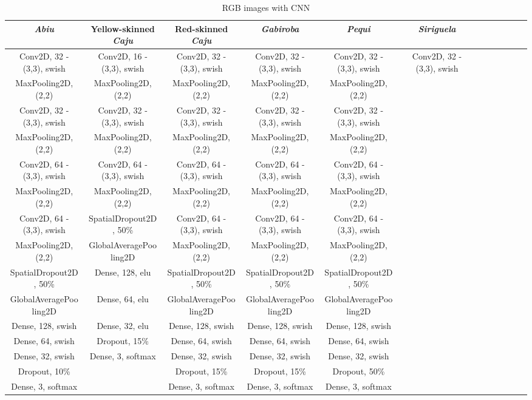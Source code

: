 \documentclass[../main.tex]{subfile}
\begin{document}
\begin{table*}[t]
    \caption{RGB images with CNN}
    \label{tab:rgb-details}

    \centering
    \begin{tabular*}{\textwidth}{@{\extracolsep{\fill}} c c c c c c c c c c c c }
        \toprule
        \textit{Abiu} & Yellow-skinned \textit{Caju}  & Red-skinned \textit{Caju} & \textit{Gabiroba} & \textit{Pequi} & \textit{Siriguela} \\
        \midrule
        Conv2D, 32 - (3,3), swish & Conv2D, 16 - (3,3), swish & Conv2D, 32 - (3,3), swish & Conv2D, 32 - (3,3), swish & Conv2D, 32 - (3,3), swish & Conv2D, 32 - (3,3), swish \\
        MaxPooling2D, (2,2) & MaxPooling2D, (2,2) & MaxPooling2D, (2,2) & MaxPooling2D, (2,2) & MaxPooling2D, (2,2) & \\
        Conv2D, 32 - (3,3), swish & Conv2D, 32 - (3,3), swish & Conv2D, 32 - (3,3), swish & Conv2D, 32 - (3,3), swish & Conv2D, 32 - (3,3), swish & \\
        MaxPooling2D, (2,2) & MaxPooling2D, (2,2) & MaxPooling2D, (2,2) & MaxPooling2D, (2,2) & MaxPooling2D, (2,2) & \\
        Conv2D, 64 - (3,3), swish & Conv2D, 64 - (3,3), swish & Conv2D, 64 - (3,3), swish & Conv2D, 64 - (3,3), swish & Conv2D, 64 - (3,3), swish & \\
        MaxPooling2D, (2,2) & MaxPooling2D, (2,2) & MaxPooling2D, (2,2) & MaxPooling2D, (2,2) & MaxPooling2D, (2,2) & \\
        Conv2D, 64 - (3,3), swish & SpatialDropout2D, 50\% & Conv2D, 64 - (3,3), swish & Conv2D, 64 - (3,3), swish & Conv2D, 64 - (3,3), swish & \\
        MaxPooling2D, (2,2) & GlobalAveragePooling2D & MaxPooling2D, (2,2) & MaxPooling2D, (2,2) & MaxPooling2D, (2,2) & \\
        SpatialDropout2D, 50\% & Dense, 128, elu & SpatialDropout2D, 50\% & SpatialDropout2D, 50\% & SpatialDropout2D, 50\% & \\
        GlobalAveragePooling2D & Dense, 64, elu & GlobalAveragePooling2D & GlobalAveragePooling2D & GlobalAveragePooling2D & \\
        Dense, 128, swish & Dense, 32, elu & Dense, 128, swish & Dense, 128, swish & Dense, 128, swish & \\
        Dense, 64, swish & Dropout, 15\% & Dense, 64, swish & Dense, 64, swish & Dense, 64, swish & \\
        Dense, 32, swish & Dense, 3, softmax & Dense, 32, swish & Dense, 32, swish & Dense, 32, swish & \\
        Dropout, 10\% & & Dropout, 15\% & Dropout, 15\% & Dropout, 50\% & \\
        Dense, 3, softmax & & Dense, 3, softmax & Dense, 3, softmax & Dense, 3, softmax & \\

        \bottomrule
    \end{tabular*}
\end{table*}
\end{document}
